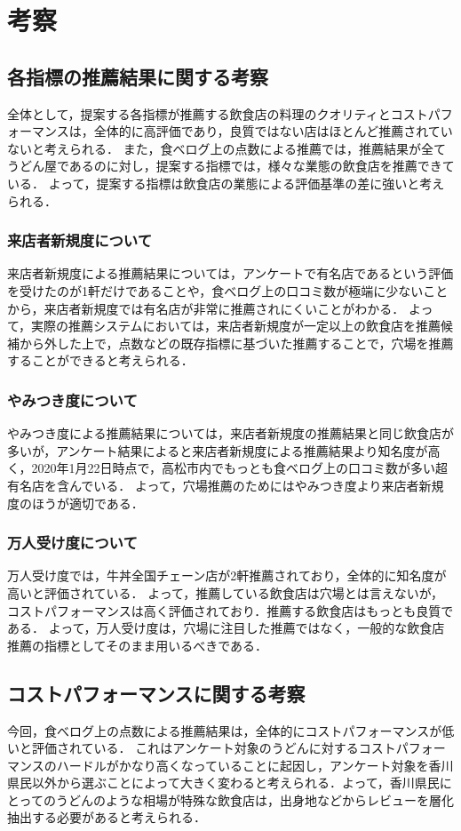 \chapter{考察}

\label{chap:discussion}

\section{各指標の推薦結果に関する考察}
全体として，提案する各指標が推薦する飲食店の料理のクオリティとコストパフォーマンスは，全体的に高評価であり，良質ではない店はほとんど推薦されていないと考えられる．
また，食べログ上の点数による推薦では，推薦結果が全てうどん屋であるのに対し，提案する指標では，様々な業態の飲食店を推薦できている．
よって，提案する指標は飲食店の業態による評価基準の差に強いと考えられる．\par
\subsection{来店者新規度について}
来店者新規度による推薦結果については，アンケートで有名店であるという評価を受けたのが1軒だけであることや，食べログ上の口コミ数が極端に少ないことから，来店者新規度では有名店が非常に推薦されにくいことがわかる．
よって，実際の推薦システムにおいては，来店者新規度が一定以上の飲食店を推薦候補から外した上で，点数などの既存指標に基づいた推薦することで，穴場を推薦することができると考えられる．\par

\subsection{やみつき度について}
やみつき度による推薦結果については，来店者新規度の推薦結果と同じ飲食店が多いが，アンケート結果によると来店者新規度による推薦結果より知名度が高く，2020年1月22日時点で，高松市内でもっとも食べログ上の口コミ数が多い超有名店を含んでいる．
よって，穴場推薦のためにはやみつき度より来店者新規度のほうが適切である．\par

\subsection{万人受け度について}
万人受け度では，牛丼全国チェーン店が2軒推薦されており，全体的に知名度が高いと評価されている．
よって，推薦している飲食店は穴場とは言えないが，コストパフォーマンスは高く評価されており．推薦する飲食店はもっとも良質である．
よって，万人受け度は，穴場に注目した推薦ではなく，一般的な飲食店推薦の指標としてそのまま用いるべきである．
\section{コストパフォーマンスに関する考察}
今回，食べログ上の点数による推薦結果は，全体的にコストパフォーマンスが低いと評価されている．
これはアンケート対象のうどんに対するコストパフォーマンスのハードルがかなり高くなっていることに起因し，アンケート対象を香川県民以外から選ぶことによって大きく変わると考えられる．よって，香川県民にとってのうどんのような相場が特殊な飲食店は，出身地などからレビューを層化抽出する必要があると考えられる．
